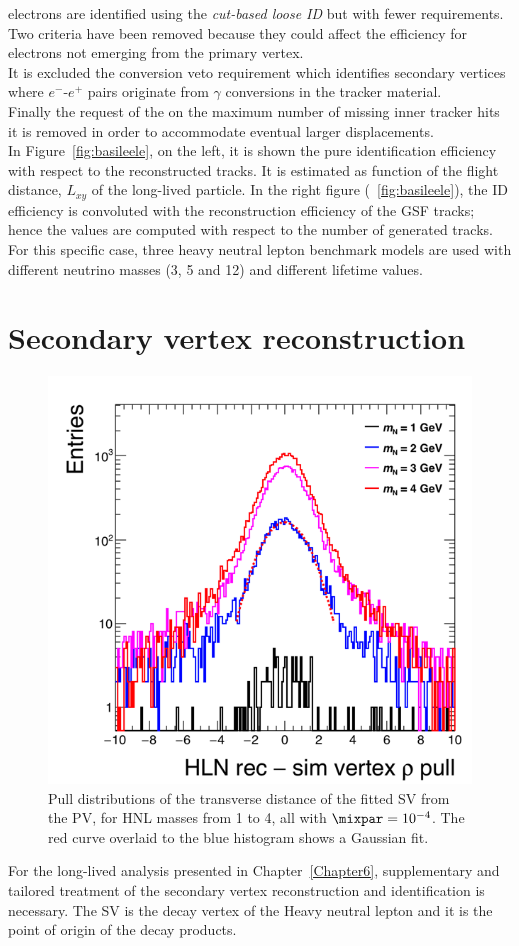 \Displ electrons are identified using the \emph{cut-based loose ID}
but with fewer requirements. Two criteria have been removed because
they could affect the efficiency for electrons
not emerging from the primary vertex. \\
It is excluded the conversion veto requirement which identifies
secondary vertices where $e^{-}$-$e^{+}$ pairs 
originate from $\gamma$ conversions in the tracker material.\\
Finally the request of the on the maximum number of
missing inner tracker hits it is removed in order to accommodate 
eventual larger displacements. \\
In Figure~\ref{fig:basileele}, on the left, it is shown the pure
identification efficiency with respect to the
reconstructed tracks. It is estimated as function of the flight
distance, $L_{xy}$ of the long-lived particle. In the right figure
(~\ref{fig:basileele}), the ID efficiency is convoluted with the
reconstruction efficiency of the GSF tracks; hence the values are
computed with respect to the number of
generated tracks. For this specific case, three heavy neutral lepton
benchmark models are used with different neutrino masses (3, 5 and
12\GeV) and different lifetime values.





\section{Secondary vertex reconstruction} \label{sec:c2sv}
\begin{figure}
\centering
  \includegraphics[clip,trim=1.cm 0cm .5cm 1.5cm, width=.38\textwidth]{Figures/c2/leptons_fromN_fromNW_vtx_rho_pull.png}
  \caption{Pull distributions of the
    transverse distance of the fitted SV from
    the PV, for HNL masses from 1 to 4\GeV,
    all with $\mixpar=10^{-4}$. The red curve overlaid to the blue
    histogram shows a Gaussian fit. \dani}
  \label{fig:svPulls}
\end{figure} 
For the long-lived analysis presented in
Chapter~\ref{Chapter6}, supplementary and
tailored treatment of the secondary vertex reconstruction and
identification is necessary. The SV is the decay vertex of the Heavy
neutral lepton and it is the point of origin of the decay products.\\

